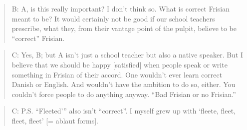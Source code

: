 \documentclass[output=paper]{langsci/langscibook}
\begin{document}
\begin{quote}
B: A, is this really important? I don’t think so. What is correct Frisian meant to be? It would certainly not be good if our school teachers prescribe, what they, from their vantage point of the pulpit, believe to be “correct” Frisian.   
 
\end{quote}

\begin{quote}
C: Yes, B; but A isn’t just a school teacher but also a native speaker. But I believe that we should be happy [satisfied] when people speak or write something in Frisian of their accord. One wouldn’t ever learn correct Danish or English. And wouldn’t have the ambition to do so, either. You couldn’t force people to do anything anyway. “Bad Frisian or no Frisian.”
\end{quote}

\begin{quote}
C: P.S. “Fleeted’” also isn’t “correct”. I myself grew up with ‘fleete, fleet, fleet, fleet’ [= ablaut forms]. 
\end{quote}
\end{document}
